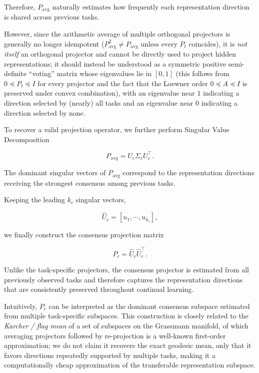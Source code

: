 \documentclass[a4paper]{article}
\begin{document}
Therefore, $P_{\mathrm{avg}}$ naturally estimates how frequently each representation direction is shared across previous tasks.

However, since the arithmetic average of multiple orthogonal projectors is generally no longer idempotent ($P_{\mathrm{avg}}^2 \ne P_{\mathrm{avg}}$ unless every $P_t$ coincides), it is \emph{not itself} an orthogonal projector and cannot be directly used to project hidden representations; it should instead be understood as a symmetric positive semi-definite ``voting'' matrix whose eigenvalues lie in $[0,1]$ (this follows from $0\preceq P_t\preceq I$ for every projector and the fact that the Loewner order $0\preceq A\preceq I$ is preserved under convex combination), with an eigenvalue near $1$ indicating a direction selected by (nearly) all tasks and an eigenvalue near $0$ indicating a direction selected by none.

To recover a valid projection operator, we further perform Singular Value Decomposition

\begin{equation}
P_{\mathrm{avg}}
=
U_c
\Sigma_c
U_c^\top.
\end{equation}

The dominant singular vectors of $P_{\mathrm{avg}}$ correspond to the representation directions receiving the strongest consensus among previous tasks.

Keeping the leading $k_c$ singular vectors,

\begin{equation}
\hat U_c
=
[u_1,\cdots,u_{k_c}],
\end{equation}

we finally construct the consensus projection matrix

\begin{equation}
P_c
=
\hat U_c
\hat U_c^\top.
\end{equation}

Unlike the task-specific projectors, the consensus projector is estimated from all previously observed tasks and therefore captures the representation directions that are consistently preserved throughout continual learning.

Intuitively, $P_c$ can be interpreted as the dominant consensus subspace estimated from multiple task-specific subspaces. This construction is closely related to the \emph{Karcher / flag mean} of a set of subspaces on the Grassmann manifold, of which averaging projectors followed by re-projection is a well-known first-order approximation; we do not claim it recovers the exact geodesic mean, only that it favors directions repeatedly supported by multiple tasks, making it a computationally cheap approximation of the transferable representation subspace.
\end{document}
